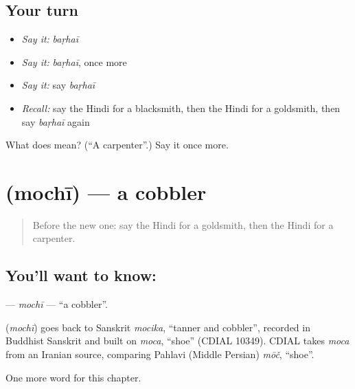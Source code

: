 \subsection*{Your turn}
\begin{itemize}
\raggedright
  \item \emph{Say it:} \emph{baṛhaī}
  \item \emph{Say it:} \emph{baṛhaī}, once more
  \item \emph{Say it:} say \emph{baṛhaī}
  \item \emph{Recall:} say the Hindi for a blacksmith, then the Hindi for a goldsmith, then say \emph{baṛhaī} again
\end{itemize}

\begin{tcolorbox}[breakable,colback=teal!4,colframe=teal!35!black,title={Before you move on}]
What does  mean? (\textquotedblleft{}A carpenter\textquotedblright{}.) Say it once more.
\end{tcolorbox}
\section[\texorpdfstring{\hi{मोची} (mochī)}{मोची (mochī)}]{ (mochī) — a cobbler}

\label{lesson:HI-C262-mochi}



\begin{quote}
Before the new one: say the Hindi for a goldsmith, then the Hindi for a carpenter.
\end{quote}

\subsection*{You'll want to know: }
\textbf{} — \emph{mochī} — \textquotedblleft{}a cobbler\textquotedblright{}.

\begin{cousinweb}
\textbf{} (\emph{mochī}) goes back to Sanskrit \emph{mocika}, \textquotedblleft{}tanner and cobbler\textquotedblright{}, recorded in Buddhist Sanskrit and built on \emph{moca}, \textquotedblleft{}shoe\textquotedblright{} (CDIAL 10349). CDIAL takes \emph{moca} from an Iranian source, comparing Pahlavi (Middle Persian) \emph{mōč}, \textquotedblleft{}shoe\textquotedblright{}.
\end{cousinweb}

\begin{grammarlens}[title={What you've built}]
One more word for this chapter.
\end{grammarlens}

